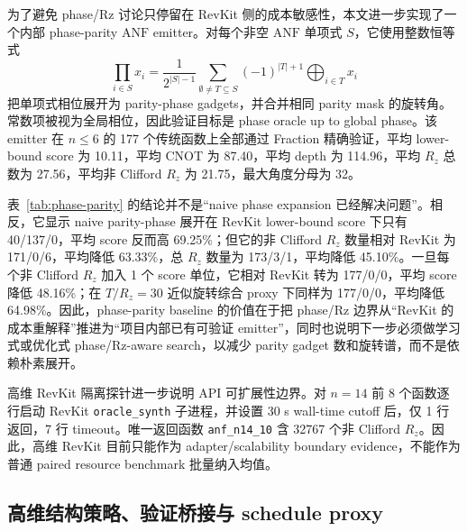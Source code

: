 \documentclass[UTF8,fontset=macnew,11pt]{ctexart}
\newcommand{\anf}{\ensuremath{\mathrm{ANF}}}
\newcommand{\rz}{\ensuremath{R_z}}
\begin{document}
为了避免 phase/Rz 讨论只停留在 RevKit 侧的成本敏感性，本文进一步实现了一个内部 phase-parity \anf{} emitter。对每个非空 \anf{} 单项式 $S$，它使用整数恒等式
\begin{equation}
  \prod_{i\in S}x_i =
  \frac{1}{2^{|S|-1}}\sum_{\emptyset\neq T\subseteq S}(-1)^{|T|+1}
  \bigoplus_{i\in T}x_i
  \label{eq:phase-parity}
\end{equation}
把单项式相位展开为 parity-phase gadgets，并合并相同 parity mask 的旋转角。常数项被视为全局相位，因此验证目标是 phase oracle up to global phase。该 emitter 在 $n\leq6$ 的 177 个传统函数上全部通过 Fraction 精确验证，平均 lower-bound score 为 10.11，平均 CNOT 为 87.40，平均 depth 为 114.96，平均 \rz{} 总数为 27.56，平均非 Clifford \rz{} 为 21.75，最大角度分母为 32。

\begin{table}[H]
\centering
\small
\caption{Phase-parity \anf{} emitter 与 RevKit \texttt{oracle\_synth} 的 phase/Rz 同口径比较。该 emitter 实现 phase oracle up to global phase；lower-bound score 只计 T-like rotations，非 Clifford \rz{} 单独报告。}
\label{tab:phase-parity}

\end{table}

表~\ref{tab:phase-parity} 的结论并不是“naive phase expansion 已经解决问题”。相反，它显示 naive parity-phase 展开在 RevKit lower-bound score 下只有 40/137/0，平均 score 反而高 69.25\%；但它的非 Clifford \rz{} 数量相对 RevKit 为 171/0/6，平均降低 63.33\%，总 \rz{} 数量为 173/3/1，平均降低 45.10\%。一旦每个非 Clifford \rz{} 加入 1 个 score 单位，它相对 RevKit 转为 177/0/0，平均 score 降低 48.16\%；在 $T/R_z=30$ 近似旋转综合 proxy 下同样为 177/0/0，平均降低 64.98\%。因此，phase-parity baseline 的价值在于把 phase/Rz 边界从“RevKit 的成本重解释”推进为“项目内部已有可验证 emitter”，同时也说明下一步必须做学习式或优化式 phase/Rz-aware search，以减少 parity gadget 数和旋转谱，而不是依赖朴素展开。

高维 RevKit 隔离探针进一步说明 API 可扩展性边界。对 $n=14$ 前 8 个函数逐行启动 RevKit \texttt{oracle\_synth} 子进程，并设置 30 s wall-time cutoff 后，仅 1 行返回，7 行 timeout。唯一返回函数 \texttt{anf\_n14\_10} 含 32767 个非 Clifford \rz{}。因此，高维 RevKit 目前只能作为 adapter/scalability boundary evidence，不能作为普通 paired resource benchmark 批量纳入均值。

\subsection{高维结构策略、验证桥接与 schedule proxy}
\end{document}
